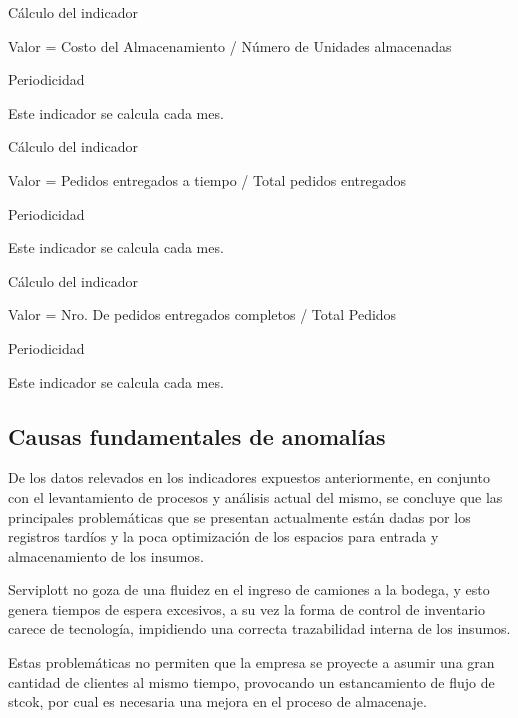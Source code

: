 
Cálculo del indicador


Valor = Costo del Almacenamiento / Número de Unidades almacenadas

Periodicidad


Este indicador se calcula cada mes.


Cálculo del indicador


Valor = Pedidos entregados a tiempo / Total pedidos entregados


Periodicidad


Este indicador se calcula cada mes.



Cálculo del indicador


Valor = Nro. De pedidos entregados completos / Total Pedidos


Periodicidad


Este indicador se calcula cada mes.


	
	\subsection{Causas fundamentales de anomalías}
	De los datos relevados en los indicadores expuestos anteriormente, en conjunto con el levantamiento de procesos y análisis actual del mismo, se concluye que las principales problemáticas que se presentan actualmente están dadas por los registros tardíos y la poca optimización de los espacios para entrada y almacenamiento de los insumos.
	
	
	Serviplott no goza de una fluidez en el ingreso de camiones a la bodega, y esto genera tiempos de espera excesivos, a su vez la forma de control de inventario carece de tecnología, impidiendo una correcta trazabilidad interna de los insumos.
	

Estas problemáticas no permiten que la empresa se proyecte a asumir una gran cantidad de clientes al mismo tiempo, provocando un estancamiento de flujo de stcok, por cual es necesaria una mejora en el proceso de almacenaje.
